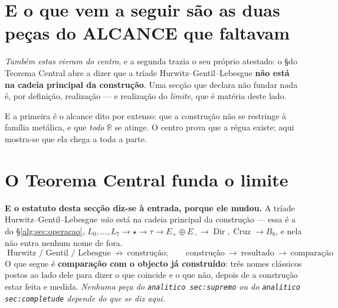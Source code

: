 \documentclass[11pt,a4paper]{article}
\newcommand{\code}[1]{\texttt{\small #1}}
\begin{document}



\section{E o que vem a seguir são as duas peças do ALCANCE que faltavam}\label{sec:todo-r}

\noindent\emph{Também estas vieram do centro}, e a segunda trazia o seu próprio atestado:
o \S do Teorema Central abre a dizer que a tríade Hurwitz--Gentil--Lebesgue \textbf{não
está na cadeia principal da construção}. Uma secção que declara não fundar nada é, por
definição, realização --- e realização do \emph{limite}, que é matéria deste lado.

E a primeira é o alcance dito por extenso: que a construção não se restringe à família
metálica, e que \emph{todo} $\mathbb{R}$ se atinge. O centro prova que a régua existe;
aqui mostra-se que ela chega a toda a parte.

\section{O Teorema Central funda o limite}\label{sec:central}

\noindent\textbf{E o estatuto desta secção diz-se à entrada, porque ele mudou.} A
tríade Hurwitz--Gentil--Lebesgue \emph{não} está na cadeia principal da construção ---
essa é a do \S\ref{alg:sec:operacao}, $L_0,\ldots,L_7\to\star\to\tau\to E_{+}\oplus E_{-}\to
\operatorname{Dir},\operatorname{Cruz}\to B_8$, e nela não entra nenhum nome de fora.
\[
\boxed{\;\text{Hurwitz / Gentil / Lebesgue}\ \not\to\ \text{construção};
\qquad
\text{construção}\ \to\ \text{resultado}\ \to\ \text{comparação}\;}
\]
O que segue é \textbf{comparação com o objecto já construído}: três nomes clássicos
postos ao lado dele para dizer o que coincide e o que não, depois de a construção estar
feita e medida. \emph{Nenhuma peça do \code{analitico sec:supremo} ou do \code{analitico sec:completude}
depende do que se diz aqui.}
\end{document}
